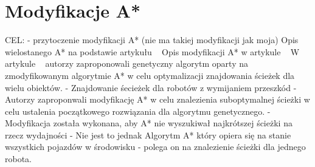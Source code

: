 \section{Modyfikacje A*}

CEL:
\newline
- przytoczenie modyfikacji A* (nie ma takiej modyfikacji jak moja)
\newline
\newline
Opis wielostanego A* na podstawie artykułu ~\cite{wojnicki2015robust} 
\newline
\newline
Opis modyfikacji A* w artykule ~\cite{munteanmobile}
\newline
\newline
W artykule ~\cite{oleiwi2014modified} autorzy zaproponowali genetyczny algorytm oparty na zmodyfikowanym algorytmie A* w celu optymalizacji znajdowania ścieżek dla wielu obiektów.
\newline
- Znajdowanie śecieżek dla robotów z wymijaniem przeszkód
\newline
- Autorzy zaproponwali modyfikację A* w celu znalezienia suboptymalnej ścieżki w celu ustalenia początkowego rozwiązania dla algorytmu genetycznego.
\newline
- Modyfikacja została wykonana, aby A* nie wyszukiwał najkrótszej ścieżki na rzecz wydajności
\newline
- Nie jest to jednak Algorytm A* który opiera się na stanie wszystkich pojazdów w środowisku - polega on na znalezienie ścieżki dla jednego robota.

